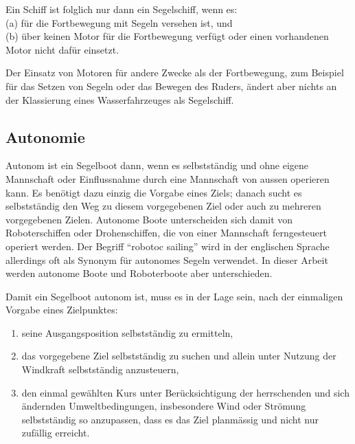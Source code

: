 Ein Schiff ist folglich nur dann ein Segelschiff, wenn es:\\
(a) für die Fortbewegung mit Segeln versehen ist, und\\
(b) über keinen Motor für die Fortbewegung verfügt oder einen vorhandenen Motor nicht dafür einsetzt. 

Der Einsatz von Motoren für andere Zwecke als der Fortbewegung, zum Beispiel für das Setzen von Segeln oder das Bewegen des Ruders, ändert aber nichts an der Klassierung eines Wasserfahrzeuges als Segelschiff. 

\subsection{Autonomie}
Autonom ist ein Segelboot dann, wenn es selbstständig und ohne eigene Mannschaft oder Einflussnahme durch eine Mannschaft von aussen operieren kann. Es benötigt dazu einzig die Vorgabe eines Ziels; danach sucht es selbstständig den Weg zu diesem vorgegebenen Ziel oder auch zu mehreren vorgegebenen Zielen. Autonome Boote unterscheiden sich damit von Roboterschiffen oder Drohenschiffen, die von einer Mannschaft ferngesteuert operiert werden. Der Begriff \enquote{robotoc sailing} wird in der englischen Sprache allerdings oft als Synonym für autonomes Segeln verwendet. In dieser Arbeit werden autonome Boote und  Roboterboote aber unterschieden.

Damit ein Segelboot autonom ist, muss es in der Lage sein, nach der einmaligen Vorgabe eines Zielpunktes: 
\begin{enumerate}
    \item seine Ausgangsposition selbstständig zu ermitteln,
    \item das vorgegebene Ziel selbstständig zu suchen und allein unter Nutzung der Windkraft selbstständig anzusteuern,
    \item den einmal gewählten Kurs unter Berücksichtigung der herrschenden und sich ändernden Umweltbedingungen, insbesondere Wind oder Strömung selbstständig so anzupassen, dass es das Ziel planmässig und nicht nur zufällig erreicht.
\end{enumerate}
